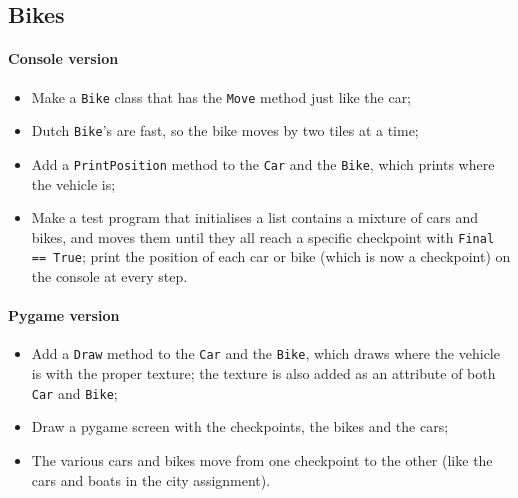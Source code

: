     \subsection{Bikes}
        \paragraph*{Console version}
        \begin{itemize}
            \item Make a \texttt{Bike} class that has the \texttt{Move} method just like the car;
            \item Dutch \texttt{Bike}'s are fast, so the bike moves by two tiles at a time;
            \item Add a \texttt{PrintPosition} method to the \texttt{Car} and the \texttt{Bike}, which prints where the vehicle is;
            \item Make a test program that initialises a list contains a mixture of cars and bikes, and moves them until they all reach a specific checkpoint with \texttt{Final == True}; print the position of each car or bike (which is now a checkpoint) on the console at every step.
        \end{itemize}

        \paragraph*{Pygame version}
        \begin{itemize}
            \item Add a \texttt{Draw} method to the \texttt{Car} and the \texttt{Bike}, which draws where the vehicle is with the proper texture; the texture is also added as an attribute of both \texttt{Car} and \texttt{Bike};
            \item Draw a pygame screen with the checkpoints, the bikes and the cars;
            \item The various cars and bikes move from one checkpoint to the other (like the cars and boats in the city assignment).
        \end{itemize}




